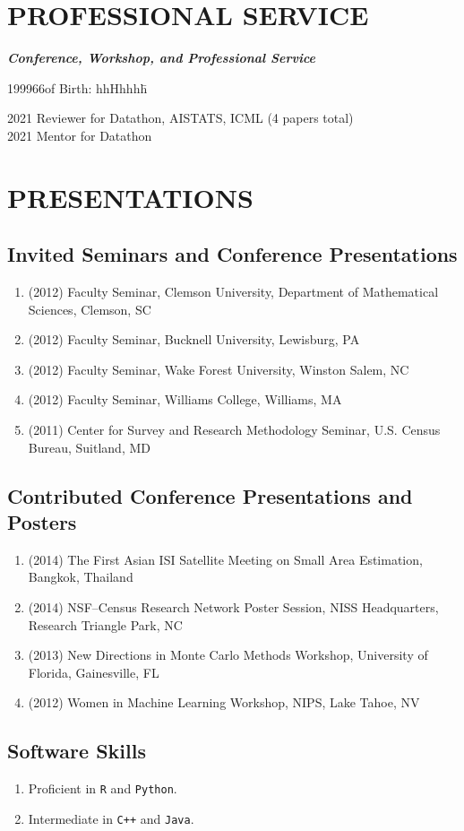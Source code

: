 \documentclass[12pt,leqno]{article}
\begin{document}
\section*{\normalsize PROFESSIONAL SERVICE}

\vspace*{.2cm}
\emph{\textbf{Conference, Workshop, and  Professional Service}}
\begin{tabbing}
199966of Birth: hhHhhhh\=\kill

2021  \> Reviewer for Datathon, AISTATS, ICML (4 papers total) \\
2021 \>  Mentor for Datathon
\end{tabbing}



\section*{\normalsize PRESENTATIONS}

\subsection*{\normalsize Invited Seminars and Conference Presentations}
\begin{enumerate}
\setlength{\itemsep}{0pt}
\item (2012) Faculty Seminar, Clemson University, Department of Mathematical Sciences, Clemson, SC
\item (2012) Faculty Seminar, Bucknell University, Lewisburg, PA
\item (2012) Faculty Seminar, Wake Forest University, Winston Salem, NC
\item (2012) Faculty Seminar, Williams College, Williams, MA
\item (2011) Center for Survey and Research Methodology Seminar, U.S. Census Bureau, Suitland, MD
\end{enumerate}

\subsection*{\normalsize Contributed Conference Presentations and Posters}
\begin{enumerate}
\setlength{\itemsep}{0pt}
\item (2014) The First Asian ISI Satellite Meeting on Small Area Estimation, Bangkok, Thailand
\item (2014) NSF--Census Research Network Poster Session, NISS Headquarters, Research  Triangle Park, NC
\item (2013) New Directions in Monte Carlo Methods Workshop, University of Florida, Gainesville, FL
\item (2012) Women in Machine Learning Workshop, NIPS, Lake Tahoe, NV 
\end{enumerate}

\subsection*{\normalsize Software Skills}
\begin{enumerate}
\item Proficient in \texttt{R} and \texttt{Python}.
\item Intermediate in \texttt{C++} and \texttt{Java}. 

\end{enumerate}
\end{document}
